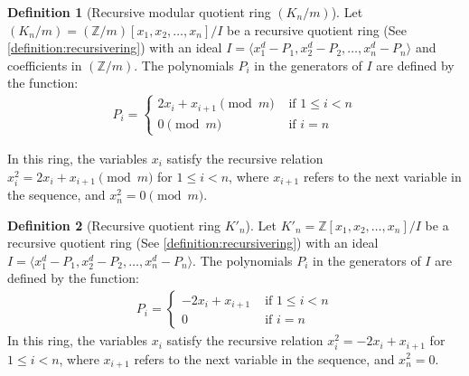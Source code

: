 \documentclass{article}
\theoremstyle{plain}
\theoremstyle{definition}
\newtheorem{definition}{Definition}
\newcommand{\Z}{\mathbb{Z}}
\newcommand{\K}{K}
\begin{document}
\begin{definition}[Recursive modular quotient ring $(\K_n/m)$] \label{definition:modring}
Let $(\K_n/m) = (\Z/m)[x_1, x_2, \ldots, x_n]/I$ be a recursive quotient ring (See \cref{definition:recursivering}) with an ideal \( I = \langle x_1^d - P_1, x_2^d - P_2, \ldots, x_n^d - P_n \rangle \) and coefficients in $(\Z/m)$. The polynomials $P_i$ in the generators of $I$ are defined by the function: 
\begin{align}
P_i =
\begin{cases}
    2x_i + x_{i+1} \pmod{m} & \text{ if } 1 \leq i < n \\
    0 \pmod{m} &\text{ if } i = n
\end{cases}
\end{align}

In this ring, the variables $x_i$ satisfy the recursive relation $x_i^2 = 2x_i + x_{i+1} \pmod{m}$ for $1 \leq i < n$, where $x_{i+1}$ refers to the next variable in the sequence, and $x_n^2 = 0 \pmod{m}$.
\end{definition}

\begin{definition}[Recursive quotient ring $\K'_n$] \label{definition:ring2}
Let $\K'_n = \Z[x_1, x_2, \ldots, x_n]/I$ be a recursive quotient ring (See \cref{definition:recursivering}) with an ideal \( I = \langle x_1^d - P_1, x_2^d - P_2, \ldots, x_n^d - P_n \rangle \). The polynomials $P_i$ in the generators of $I$ are defined by the function: 
\begin{align}
P_i =
\begin{cases}
    -2x_i + x_{i+1} & \text{ if } 1 \leq i < n \\
    0 &\text{ if } i = n
\end{cases}
\end{align}
In this ring, the variables $x_i$ satisfy the recursive relation $x_i^2 = -2x_i + x_{i+1}$ for $1 \leq i < n$, where $x_{i+1}$ refers to the next variable in the sequence, and $x_n^2 = 0$.
\end{definition}
\end{document}
